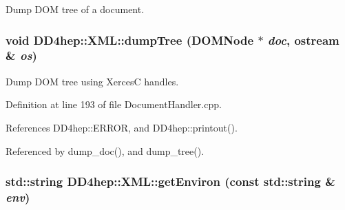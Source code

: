 Dump DOM tree of a document. \hypertarget{namespace_d_d4hep_1_1_x_m_l_a5378d08fbf2f2c9e495fc772360b62d8}{
\subsubsection[{dumpTree}]{\setlength{\rightskip}{0pt plus 5cm}void DD4hep::XML::dumpTree (DOMNode $\ast$ {\em doc}, \/  ostream \& {\em os})}}
\label{namespace_d_d4hep_1_1_x_m_l_a5378d08fbf2f2c9e495fc772360b62d8}


Dump DOM tree using XercesC handles. 

Definition at line 193 of file DocumentHandler.cpp.

References DD4hep::ERROR, and DD4hep::printout().

Referenced by dump\_\-doc(), and dump\_\-tree().\hypertarget{namespace_d_d4hep_1_1_x_m_l_aed4e2c9933fc3d7c9fe92278ca5300a4}{
\subsubsection[{getEnviron}]{\setlength{\rightskip}{0pt plus 5cm}std::string DD4hep::XML::getEnviron (const std::string \& {\em env})}}
\label{namespace_d_d4hep_1_1_x_m_l_aed4e2c9933fc3d7c9fe92278ca5300a4}


